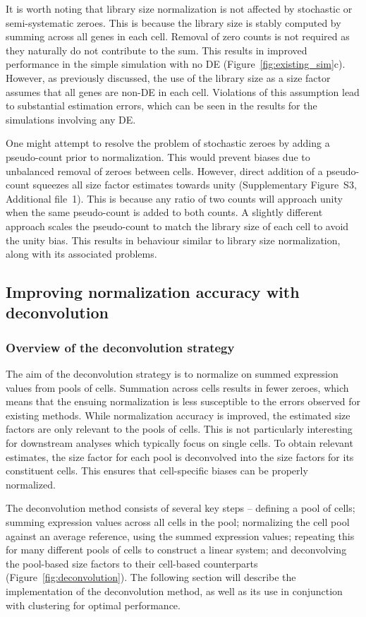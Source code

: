 \documentclass{bmcart}
\newcommand{\supppseudo}{S3}
\begin{document}
It is worth noting that library size normalization is not affected by stochastic or semi-systematic zeroes.
This is because the library size is stably computed by summing across all genes in each cell.
Removal of zero counts is not required as they naturally do not contribute to the sum.
This results in improved performance in the simple simulation with no DE (Figure~\ref{fig:existing_sim}c).
However, as previously discussed, the use of the library size as a size factor assumes that all genes are non-DE in each cell.
Violations of this assumption lead to substantial estimation errors, which can be seen in the results for the simulations involving any DE.

One might attempt to resolve the problem of stochastic zeroes by adding a pseudo-count prior to normalization.
This would prevent biases due to unbalanced removal of zeroes between cells.
However, direct addition of a pseudo-count squeezes all size factor estimates towards unity (Supplementary Figure~\supppseudo{}, Additional file~1).
This is because any ratio of two counts will approach unity when the same pseudo-count is added to both counts.
A slightly different approach scales the pseudo-count to match the library size of each cell to avoid the unity bias.
This results in behaviour similar to library size normalization, along with its associated problems.

\subsection*{Improving normalization accuracy with deconvolution}

\subsubsection*{Overview of the deconvolution strategy}
The aim of the deconvolution strategy is to normalize on summed expression values from pools of cells.
Summation across cells results in fewer zeroes, which means that the ensuing normalization is less susceptible to the errors observed for existing methods.
While normalization accuracy is improved, the estimated size factors are only relevant to the pools of cells.
This is not particularly interesting for downstream analyses which typically focus on single cells.
To obtain relevant estimates, the size factor for each pool is deconvolved into the size factors for its constituent cells.
This ensures that cell-specific biases can be properly normalized.

The deconvolution method consists of several key steps --
    defining a pool of cells;
    summing expression values across all cells in the pool;
    normalizing the cell pool against an average reference, using the summed expression values;
    repeating this for many different pools of cells to construct a linear system;
    and deconvolving the pool-based size factors to their cell-based counterparts (Figure~\ref{fig:deconvolution}).
The following section will describe the implementation of the deconvolution method, as well as its use in conjunction with clustering for optimal performance.
\end{document}
